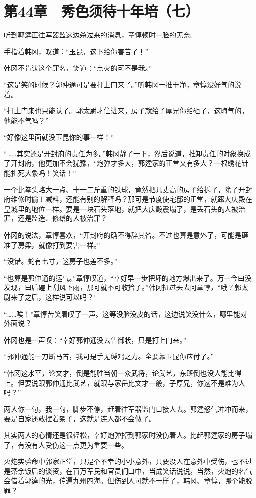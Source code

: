\section{第44章　秀色须待十年培（七）}

听到郭逵正往军器监这边杀过来的消息，章惇顿时一脸的无奈。

手指着韩冈，叹道：“玉昆，这下给你害苦了！”

韩冈不肯认这个罪名，笑道：“点火的可不是我。”

“这是笑的时候？郭仲通可是要打上门来了。”听韩冈一推干净，章惇没好气的说着。

“打上门来也只能认了。郭太尉才住进来，房子就给子厚兄你给砸了，这晦气的，他能不气吗？”

“好像这里面就没玉昆你的事一样！”

“……其实还是开封府的责任为多。”韩冈静了一下，然后说道，推卸责任的对象换成了开封府，他更加不会犹豫，“炮弹才多大，郭逵家的正堂又有多大？一根绣花针能扎死大象吗！笑话！”

一个比拳头略大一点、十一二斤重的铁球，竟然把几丈高的房子给拆了，除了开封府维修时偷工减料，还能有别的解释吗？那可是节度使宅邸的正堂，就跟大庆殿在皇城里的地位一样。要是一块石头落地，就把大庆殿震塌了，是丢石头的人被治罪，还是监造、修缮的人被治罪？

韩冈的说法，章惇喜欢，“开封府的确不得辞其咎。不过也算是意外了，可能是砸准了房梁，就像打到要害一样。”

“没错。蛇有七寸，这房子也差不多。”

“也算是郭仲通的运气。”章惇叹道，“幸好早一步把坏的地方爆出来了。万一今曰没发现，曰后碰上刮风下雨，那可就不可收拾了。”韩冈扭过头去问章惇，“哦？郭太尉来了之后，这样说可以吗？”

“……唉！”章惇苦笑着叹了一声。这等没脸没皮的话，这边说笑没什么，哪里能对外面说？

韩冈也是一声叹：“幸好郭仲通没去告御状，只是打上门来。”

“郭仲通能一刀断马首，我可是手无缚鸡之力。全要靠玉昆你应付了。”

“韩冈这水平，论文才，倒是能胜当朝一众武将，论武艺，东班倒也没人能比得上。但要说跟郭仲通比武艺，就跟与家岳比文才一般，子厚兄，你这不是难为人吗？”

两人你一句，我一句，脚步不停，赶着往军器监门口接人去。郭逵怒气冲冲而来，要是自家还敢摆着架子，这就是连人都不会做了。

其实两人的心情还是很轻松，幸好炮弹掉到郭家时没伤着人。比起郭逵家的房子塌了，有没有人受伤这一点更为重要一些。

火炮实验命中郭家正堂，只是个不幸的小小意外，只要没人在意外中受伤，也不过是茶余饭后的谈资，在百万军民和官员们口中，当成笑话说说。当然，火炮的名气会借着郭逵的光，传遍九州四海。但伤到人可就不一样了，韩冈、章惇，哪个能脱罪？

